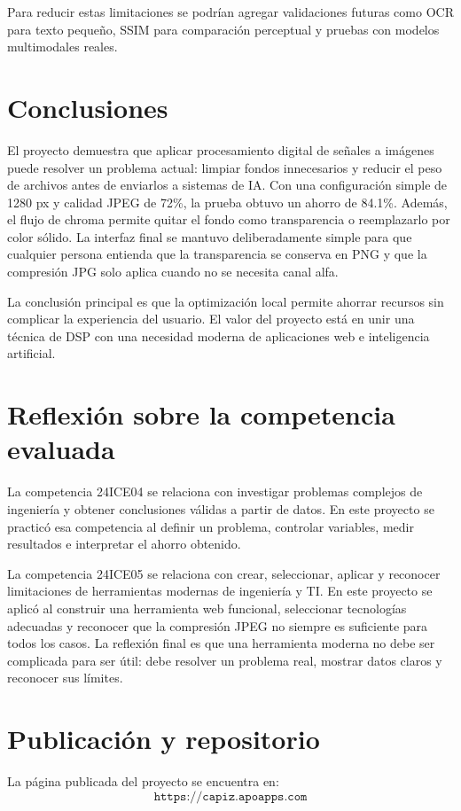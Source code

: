 \documentclass[12pt,letterpaper]{article}
\begin{document}
Para reducir estas limitaciones se podrían agregar validaciones futuras como OCR para texto pequeño, SSIM para comparación perceptual y pruebas con modelos multimodales reales.

\section{Conclusiones}
El proyecto demuestra que aplicar procesamiento digital de señales a imágenes puede resolver un problema actual: limpiar fondos innecesarios y reducir el peso de archivos antes de enviarlos a sistemas de IA. Con una configuración simple de 1280 px y calidad JPEG de 72\%, la prueba obtuvo un ahorro de 84.1\%. Además, el flujo de chroma permite quitar el fondo como transparencia o reemplazarlo por color sólido. La interfaz final se mantuvo deliberadamente simple para que cualquier persona entienda que la transparencia se conserva en PNG y que la compresión JPG solo aplica cuando no se necesita canal alfa.

La conclusión principal es que la optimización local permite ahorrar recursos sin complicar la experiencia del usuario. El valor del proyecto está en unir una técnica de DSP con una necesidad moderna de aplicaciones web e inteligencia artificial.

\section{Reflexión sobre la competencia evaluada}
La competencia 24ICE04 se relaciona con investigar problemas complejos de ingeniería y obtener conclusiones válidas a partir de datos. En este proyecto se practicó esa competencia al definir un problema, controlar variables, medir resultados e interpretar el ahorro obtenido.

La competencia 24ICE05 se relaciona con crear, seleccionar, aplicar y reconocer limitaciones de herramientas modernas de ingeniería y TI. En este proyecto se aplicó al construir una herramienta web funcional, seleccionar tecnologías adecuadas y reconocer que la compresión JPEG no siempre es suficiente para todos los casos. La reflexión final es que una herramienta moderna no debe ser complicada para ser útil: debe resolver un problema real, mostrar datos claros y reconocer sus límites.

\section*{Publicación y repositorio}
La página publicada del proyecto se encuentra en:
\[
\texttt{https://capiz.apoapps.com}
\]
\end{document}
